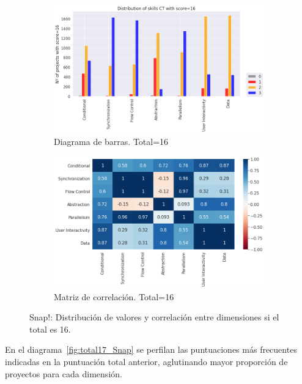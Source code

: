 \documentclass[a4paper, 12pt]{book}
\begin{document}
\begin{figure}[H]
    \centering
    \begin{subfigure}[h]{.49\textwidth} 
        \includegraphics[width=\textwidth]{img/distribucion_16_Snap}
        \caption{Diagrama de barras. Total=16}
        \label{fig:total16_Snap}
    \end{subfigure}       
    \begin{subfigure}[h]{.49\textwidth} 
        \includegraphics[width=\textwidth]{img/corr_16_Snap}
        \caption{Matriz de correlación. Total=16}
        \label{fig:corr16_Snap}
    \end{subfigure}
    \caption{Snap!: Distribución de valores y correlación entre dimensiones si el total es 16.}
\end{figure}

En el diagrama~\ref{fig:total17_Snap} se perfilan las puntuaciones más frecuentes indicadas en la puntuación total anterior, aglutinando mayor proporción de proyectos para cada dimensión.
\end{document}
